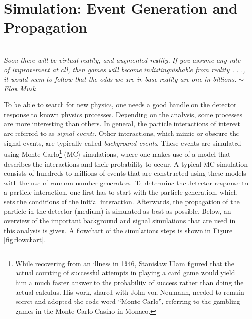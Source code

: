 \chapter{Simulation: Event Generation and Propagation}
\label{ch:simulation}
\begin{flushright}
\textit{\\Soon there will be virtual reality, and augmented reality. If you assume any rate of improvement at all, then games will become indistinguishable from reality . . ., it would seem to follow that the odds we are in base reality are one in billions. $\sim$ Elon Musk\\}
\end{flushright}
To be able to search for new physics, one needs a good handle on the detector response to known physics processes. Depending on the analysis, some processes are more interesting than others. In general, the particle interactions of interest are referred to as \textit{signal events}. Other interactions, which mimic or obscure the signal events, are typically called \textit{background events}. These events are simulated using Monte Carlo\footnote{While recovering from an illness in 1946, Stanislaw Ulam figured that the actual counting of successful attempts in playing a card game would yield him a much faster answer to the probability of success rather than doing the actual calculus. His work, shared with John von Neumann, needed to remain secret and adopted the code word ``Monte Carlo'', referring to the gambling games in the Monte Carlo Casino in Monaco.} (MC) simulations, where one makes use of a model that describes the interactions and their probability to occur. A typical MC simulation consists of hundreds to millions of events that are constructed using these models with the use of random number generators. To determine the detector response to a particle interaction, one first has to start with the particle generation, which sets the conditions of the initial interaction. Afterwards, the propagation of the particle in the detector (medium) is simulated as best as possible. Below, an overview of the important background and signal simulations that are used in this analysis is given. A flowchart of the simulations steps is shown in Figure \ref{fig:flowchart}.

